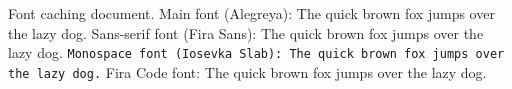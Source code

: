 \documentclass{article}
\begin{document}
Font caching document. Main font (Alegreya): The quick brown fox jumps over the lazy dog. \textsf{Sans-serif font (Fira Sans): The quick brown fox jumps over the lazy dog.} \texttt{Monospace font (Iosevka Slab): The quick brown fox jumps over the lazy dog.} {\firacode Fira Code font: The quick brown fox jumps over the lazy dog.}
\end{document}
